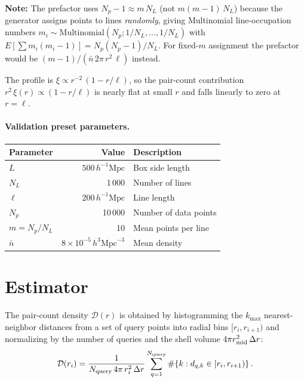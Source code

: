 \documentclass[11pt]{article}
\begin{document}
\textbf{Note:} The prefactor uses $N_p - 1 \approx m\,N_L$ (not
$m(m{-}1)\,N_L$) because the generator assigns points to lines
\emph{randomly}, giving Multinomial line-occupation numbers
$m_i \sim \mathrm{Multinomial}(N_p; 1/N_L, \ldots, 1/N_L)$ with
$E[\sum m_i(m_i{-}1)] = N_p(N_p{-}1)/N_L$.  For fixed-$m$ assignment
the prefactor would be $(m{-}1)/(\bar{n}\,2\pi\,r^2\,\ell)$ instead.

The profile is $\xi \propto r^{-2}\,(1 - r/\ell)$, so the pair-count
contribution $r^2\,\xi(r) \propto (1 - r/\ell)$ is nearly flat at small
$r$ and falls linearly to zero at $r = \ell$.

\paragraph{Validation preset parameters.}
\begin{center}
\begin{tabular}{@{}lrl@{}}
\toprule
Parameter & Value & Description \\
\midrule
$L$           & $500\,h^{-1}\mathrm{Mpc}$ & Box side length \\
$N_L$         & 1\,000   & Number of lines \\
$\ell$        & $200\,h^{-1}\mathrm{Mpc}$ & Line length \\
$N_p$         & 10\,000  & Number of data points \\
$m = N_p/N_L$ & 10       & Mean points per line \\
$\bar{n}$     & $8 \times 10^{-5}\,h^3\mathrm{Mpc}^{-3}$ & Mean density \\
\bottomrule
\end{tabular}
\end{center}

\section{Estimator}

The pair-count density $\mathcal{D}(r)$ is obtained by histogramming
the $k_{\max}$ nearest-neighbor distances from a set of query points
into radial bins $[r_i, r_{i+1})$ and normalizing by the number of
queries and the shell volume $4\pi r_{\rm mid}^2\,\Delta r$:
\begin{equation}
  \mathcal{D}(r_i)
    = \frac{1}{N_{\rm query}\,4\pi\,r_i^2\,\Delta r}
      \sum_{q=1}^{N_{\rm query}} \#\{k : d_{q,k} \in [r_i, r_{i+1})\}\,.
\end{equation}
\end{document}
